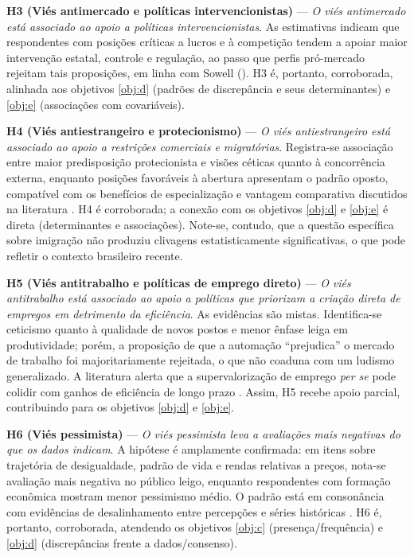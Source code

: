 \textbf{H3 (Viés antimercado e políticas intervencionistas)} — \textit{O viés antimercado está associado ao apoio a políticas intervencionistas}. As estimativas indicam que respondentes com posições críticas a lucros e à competição tendem a apoiar maior intervenção estatal, controle e regulação, ao passo que perfis pró-mercado rejeitam tais proposições, em linha com Sowell (\citeyear{sowell2000basic,sowell2004applied,sowell2007conflict}). H3 é, portanto, corroborada, alinhada aos objetivos \autoref{obj:d} (padrões de discrepância e seus determinantes) e \autoref{obj:e} (associações com covariáveis).

\textbf{H4 (Viés antiestrangeiro e protecionismo)} — \textit{O viés antiestrangeiro está associado ao apoio a restrições comerciais e migratórias}. Registra-se associação entre maior predisposição protecionista e visões céticas quanto à concorrência externa, enquanto posições favoráveis à abertura apresentam o padrão oposto, compatível com os benefícios de especialização e vantagem comparativa discutidos na literatura \cite{bhagwati2003free, The_Myth_of_the_Rational_Voter}. H4 é corroborada; a conexão com os objetivos \autoref{obj:d} e \autoref{obj:e} é direta (determinantes e associações). Note-se, contudo, que a questão específica sobre imigração não produziu clivagens estatisticamente significativas, o que pode refletir o contexto brasileiro recente.

\textbf{H5 (Viés antitrabalho e políticas de emprego direto)} — \textit{O viés antitrabalho está associado ao apoio a políticas que priorizam a criação direta de empregos em detrimento da eficiência}. As evidências são mistas. Identifica-se ceticismo quanto à qualidade de novos postos e menor ênfase leiga em produtividade; porém, a proposição de que a automação “prejudica” o mercado de trabalho foi majoritariamente rejeitada, o que não coaduna com um ludismo generalizado. A literatura alerta que a supervalorização de emprego \emph{per se} pode colidir com ganhos de eficiência de longo prazo \cite{landsburg2012armchair,sowell2007conflict}. Assim, H5 recebe apoio parcial, contribuindo para os objetivos \autoref{obj:d} e \autoref{obj:e}.

\textbf{H6 (Viés pessimista)} — \textit{O viés pessimista leva a avaliações mais negativas do que os dados indicam}. A hipótese é amplamente confirmada: em itens sobre trajetória de desigualdade, padrão de vida e rendas relativas a preços, nota-se avaliação mais negativa no público leigo, enquanto respondentes com formação econômica mostram menor pessimismo médio. O padrão está em consonância com evidências de desalinhamento entre percepções e séries históricas \cite{easterbrook2004progress, ridleyotimista}. H6 é, portanto, corroborada, atendendo os objetivos \autoref{obj:c} (presença/frequência) e \autoref{obj:d} (discrepâncias frente a dados/consenso).


